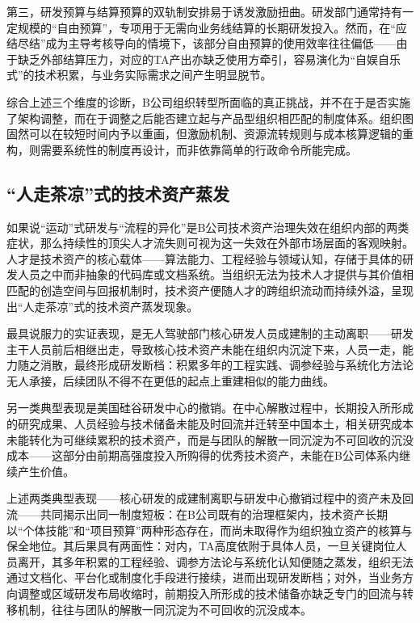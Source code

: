 第三，研发预算与结算预算的双轨制安排易于诱发激励扭曲。研发部门通常持有一定规模的“自由预算”，专项用于无需向业务线结算的长期研发投入。然而，在“应结尽结”成为主导考核导向的情境下，该部分自由预算的使用效率往往偏低——由于缺乏外部结算压力，对应的TA产出亦缺乏使用方牵引，容易演化为“自娱自乐式”的技术积累，与业务实际需求之间产生明显脱节。

综合上述三个维度的诊断，B公司组织转型所面临的真正挑战，并不在于是否实施了架构调整，而在于调整之后能否建立起与产品型组织相匹配的制度体系。组织图固然可以在较短时间内予以重画，但激励机制、资源流转规则与成本核算逻辑的重构，则需要系统性的制度再设计，而非依靠简单的行政命令所能完成。

\subsection{“人走茶凉”式的技术资产蒸发}
\label{subsec:talent-evaporation}

如果说“运动”式研发与“流程的异化”是B公司技术资产治理失效在组织内部的两类症状，那么持续性的顶尖人才流失则可视为这一失效在外部市场层面的客观映射。人才是技术资产的核心载体——算法能力、工程经验与领域认知，存储于具体的研发人员之中而非抽象的代码库或文档系统。当组织无法为技术人才提供与其价值相匹配的创造空间与回报机制时，技术资产便随人才的跨组织流动而持续外溢，呈现出“人走茶凉”式的技术资产蒸发现象。

最具说服力的实证表现，是无人驾驶部门核心研发人员成建制的主动离职——研发主干人员前后相继出走，导致核心技术资产未能在组织内沉淀下来，人员一走，能力随之消散，最终形成研发断档：积累多年的工程实践、调参经验与系统化方法论无人承接，后续团队不得不在更低的起点上重建相似的能力曲线。

另一类典型表现是美国硅谷研发中心的撤销。在中心解散过程中，长期投入所形成的研究成果、人员经验与技术储备未能及时回流并迁转至中国本土，相关研究成本未能转化为可继续累积的技术资产，而是与团队的解散一同沉淀为不可回收的沉没成本——这部分由前期高强度投入所购得的优秀技术资产，未能在B公司体系内继续产生价值。

上述两类典型表现——核心研发的成建制离职与研发中心撤销过程中的资产未及回流——共同揭示出同一制度短板：在B公司既有的治理框架内，技术资产长期以“个体技能”和“项目预算”两种形态存在，而尚未取得作为组织独立资产的核算与保全地位。其后果具有两面性：对内，TA高度依附于具体人员，一旦关键岗位人员离开，其多年积累的工程经验、调参方法论与系统化认知便随之蒸发，组织无法通过文档化、平台化或制度化手段进行接续，进而出现研发断档；对外，当业务方向调整或区域研发布局收缩时，前期投入所形成的技术储备亦缺乏专门的回流与转移机制，往往与团队的解散一同沉淀为不可回收的沉没成本。

